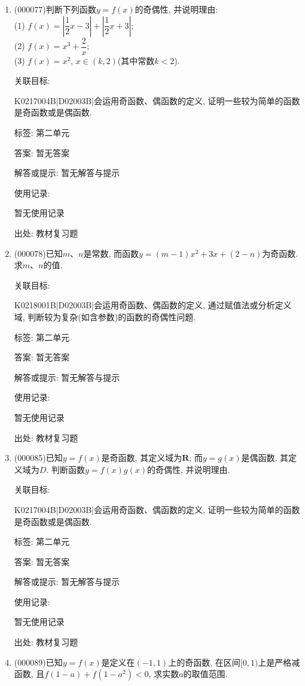 \documentclass[10pt,a4paper]{article}
\begin{document}
\begin{enumerate}[1.]

\item { (000077)}判断下列函数$y=f(x)$的奇偶性, 并说明理由:\\
(1) $f(x)=|\dfrac 12 x-3|+|\dfrac 12 x+3|$;\\
(2) $f(x)=x^3+\dfrac 2x$;\\
(3) $f(x)=x^2$, $x\in (k, 2)$(其中常数$k<2$).


关联目标:

K0217004B|D02003B|会运用奇函数、偶函数的定义, 证明一些较为简单的函数是奇函数或是偶函数.



标签: 第二单元

答案: 暂无答案

解答或提示: 暂无解答与提示

使用记录:

暂无使用记录


出处: 教材复习题
\item { (000078)}已知$m$、$n$是常数, 而函数$y=(m-1)x^2+3x+(2-n)$为奇函数. 求$m$、$n$的值.


关联目标:

K0218001B|D02003B|会运用奇函数、偶函数的定义, 通过赋值法或分析定义域, 判断较为复杂(如含参数)的函数的奇偶性问题.



标签: 第二单元

答案: 暂无答案

解答或提示: 暂无解答与提示

使用记录:

暂无使用记录


出处: 教材复习题
\item { (000085)}已知$y=f(x)$是奇函数, 其定义域为$\mathbf{R}$; 而$y=g(x)$是偶函数, 其定义域为$D$. 判断函数$y=f(x)g(x)$的奇偶性, 并说明理由.


关联目标:

K0217004B|D02003B|会运用奇函数、偶函数的定义, 证明一些较为简单的函数是奇函数或是偶函数.



标签: 第二单元

答案: 暂无答案

解答或提示: 暂无解答与提示

使用记录:

暂无使用记录


出处: 教材复习题
\item { (000089)}已知$y=f(x)$是定义在$(-1, 1)$上的奇函数, 在区间$[0, 1)$上是严格减函数, 且$f(1-a)+f(1-a^2)<0$, 求实数$a$的取值范围.



\end{enumerate}
\end{document}
